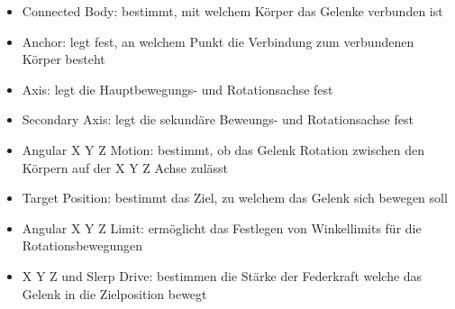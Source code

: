 \begin{itemize}
  \item Connected Body: bestimmt, mit welchem Körper das Gelenke verbunden ist
  \item Anchor: legt fest, an welchem Punkt die Verbindung zum verbundenen Körper besteht
  \item Axis: legt die Hauptbewegungs- und Rotationsachse fest
  \item Secondary Axis: legt die sekundäre Beweungs- und Rotationsachse fest
  \item Angular X Y Z Motion: bestimmt, ob das Gelenk Rotation zwischen den Körpern auf der X Y Z Achse zulässt
  \item Target Position: bestimmt das Ziel, zu welchem das Gelenk sich bewegen soll
  \item Angular X Y Z Limit: ermöglicht das Festlegen von Winkellimits für die Rotationsbewegungen
  \item X Y Z  und Slerp Drive: bestimmen die Stärke der Federkraft welche das Gelenk in die Zielposition bewegt
\end{itemize}